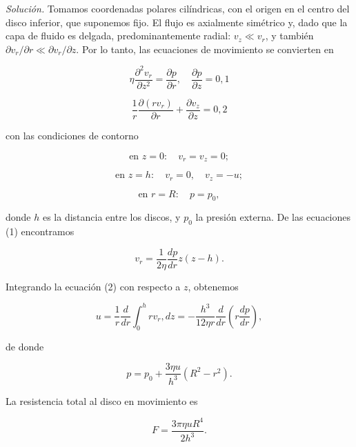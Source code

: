 \documentclass{article}
\begin{document}
\textit{Solución.} Tomamos coordenadas polares cilíndricas, con el origen en el centro del disco inferior, que suponemos fijo. El flujo es axialmente simétrico y, dado que la capa de fluido es delgada, predominantemente radial: $v_z \ll v_r$, y también $\partial v_r/\partial r \ll \partial v_r/\partial z$. Por lo tanto, las ecuaciones de movimiento se convierten en

$$
\eta \frac{\partial^2 v_r}{\partial z^2} = \frac{\partial p}{\partial r}, \quad \frac{\partial p}{\partial z} = 0, {1}
$$

$$
\frac{1}{r} \frac{\partial (rv_r)}{\partial r} + \frac{\partial v_z}{\partial z} = 0, {2}
$$

con las condiciones de contorno

$$
\text{en } z = 0: \quad v_r = v_z = 0;
$$

$$
\text{en } z = h: \quad v_r = 0, \quad v_z = -u;
$$

$$
\text{en } r = R: \quad p = p_0,
$$

donde $h$ es la distancia entre los discos, y $p_0$ la presión externa. De las ecuaciones (1) encontramos

$$
v_r = \frac{1}{2\eta} \frac{dp}{dr} z(z - h).
$$

Integrando la ecuación (2) con respecto a $z$, obtenemos

$$
u = \frac{1}{r} \frac{d}{dr} \int_0^h rv_r , dz = -\frac{h^3}{12\eta r} \frac{d}{dr} \left( r \frac{dp}{dr} \right),
$$

de donde

$$
p = p_0 + \frac{3\eta u}{h^3} (R^2 - r^2).
$$

La resistencia total al disco en movimiento es

$$
F = \frac{3\pi \eta u R^4}{2h^3}.
$$
\end{document}
